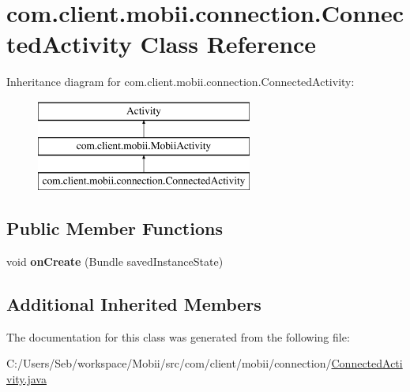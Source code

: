 \hypertarget{classcom_1_1client_1_1mobii_1_1connection_1_1_connected_activity}{\section{com.\-client.\-mobii.\-connection.\-Connected\-Activity Class Reference}
\label{classcom_1_1client_1_1mobii_1_1connection_1_1_connected_activity}
}
Inheritance diagram for com.\-client.\-mobii.\-connection.\-Connected\-Activity\-:\begin{figure}[H]
\begin{center}
\leavevmode
\includegraphics[height=3.000000cm]{classcom_1_1client_1_1mobii_1_1connection_1_1_connected_activity}
\end{center}
\end{figure}
\subsection*{Public Member Functions}
\begin{DoxyCompactItemize}
\item 
\hypertarget{classcom_1_1client_1_1mobii_1_1connection_1_1_connected_activity_a24d7fabafb185fda6b4eb2e6a7491ddf}{void {\bfseries on\-Create} (Bundle saved\-Instance\-State)}\label{classcom_1_1client_1_1mobii_1_1connection_1_1_connected_activity_a24d7fabafb185fda6b4eb2e6a7491ddf}

\end{DoxyCompactItemize}
\subsection*{Additional Inherited Members}


The documentation for this class was generated from the following file\-:\begin{DoxyCompactItemize}
\item 
C\-:/\-Users/\-Seb/workspace/\-Mobii/src/com/client/mobii/connection/\hyperlink{_connected_activity_8java}{Connected\-Activity.\-java}\end{DoxyCompactItemize}
